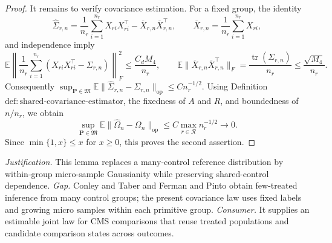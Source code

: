 \documentclass{article}
\begin{document}
\begin{proof}
It remains to verify covariance estimation.  For a fixed group, the identity
\[
 \widehat\Sigma_{r,n}
 =\frac1{n_r}\sum_{i=1}^{n_r}X_{ri}X_{ri}^{\top}
   -\overline X_{r,n}\overline X_{r,n}^{\top},
\qquad
 \overline X_{r,n}=\frac1{n_r}\sum_{i=1}^{n_r}X_{ri},
\]
and independence imply
\[
 \mathbb E\left\|
  \frac1{n_r}\sum_{i=1}^{n_r}(X_{ri}X_{ri}^{\top}-\Sigma_{r,n})
 \right\|_F^2\le\frac{C_dM_4}{n_r},
\qquad
 \mathbb E\|\overline X_{r,n}\overline X_{r,n}^{\top}\|_F
 =\frac{\operatorname{tr}(\Sigma_{r,n})}{n_r}
 \le\frac{\sqrt{M_4}}{n_r}.
\]
Consequently
\(
 \sup_{\mathbf P\in\mathfrak M}
 \mathbb E\|\widehat\Sigma_{r,n}-\Sigma_{r,n}\|_{\mathrm{op}}
 \le Cn_r^{-1/2}
\).
Using Definition \(\mathrm{def:shared\text{-}covariance\text{-}estimator}\), the fixedness of \(A\) and \(R\), and boundedness of \(n/n_r\), we obtain
\[
 \sup_{\mathbf P\in\mathfrak M}
 \mathbb E\|\widehat\Omega_n-\Omega_n\|_{\mathrm{op}}
 \le C\max_{r\in\mathcal R}n_r^{-1/2}\longrightarrow0.
\]
Since \(\min\{1,x\}\le x\) for \(x\ge0\), this proves the second assertion.
\end{proof}
\par\smallskip\noindent \textit{Justification.} This lemma replaces a many-control reference distribution by within-group micro-sample Gaussianity while preserving shared-control dependence. \textit{Gap.} Conley and Taber and Ferman and Pinto obtain few-treated inference from many control groups; the present covariance law uses fixed labels and growing micro samples within each primitive group. \textit{Consumer.} It supplies an estimable joint law for CMS comparisons that reuse treated populations and candidate comparison states across outcomes.
\end{document}
